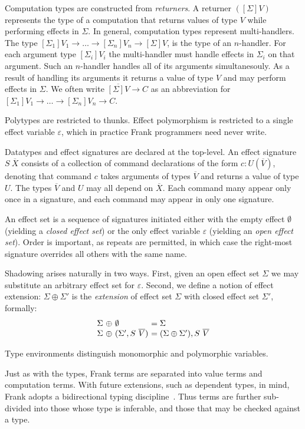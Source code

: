 \documentclass[preprint]{sigplanconf}
\newcommand{\many}{\overline}
\newcommand\ba{\begin{array}}
\newcommand\ea{\end{array}}
\newcommand{\sig}{S}
\newcommand{\sigs}{\Sigma}
\newcommand{\effbox}[1]{[#1]}
\begin{document}
Computation types are constructed from \emph{returners}.  A returner
$(\effbox{\sigs}V)$ represents the type of a computation that returns
values of type $V$ while performing effects in $\sigs$.
%
In general, computation types represent multi-handlers. The type
$\effbox{\sigs_1}V_1 \to \dots \to \effbox{\sigs_n}V_n \to
\effbox{\sigs}V$,
%
is the type of an $n$-handler. For each argument type
$\effbox{\sigs_i}V_i$ the multi-handler must handle effects in
$\sigs_i$ on that argument. Such an $n$-handler handles all of its
arguments simultanesouly. As a result of handling its arguments it
returns a value of type $V$ and may perform effects in $\sigs$.
%
We often write $\many{\effbox{\sigs}V} \to C$ as an abbreviation for
$\effbox{\sigs_1}V_1 \to \dots \to \effbox{\sigs_n}V_n \to C$.

Polytypes are restricted to thunks. Effect polymorphism is restricted
to a single effect variable $\varepsilon$, which in practice Frank
programmers need never write.

Datatypes and effect signatures are declared at the top-level. An
effect signature $S~\many{X}$ consists of a collection of command
declarations of the form $c:U(\many{V})$, denoting that command $c$
takes arguments of types $\many{V}$ and returns a value of type
$U$. The types $\many{V}$ and $U$ may all depend on $\many{X}$. Each
command many appear only once in a signature, and each command may
appear in only one signature.

An effect set is a sequence of signatures initiated either with the
empty effect $\emptyset$ (yielding a \emph{closed effect set}) or the
only effect variable $\varepsilon$ (yielding an \emph{open effect
  set}). Order is important, as repeats are permitted, in which case
the right-most signature overrides all others with the same name.

Shadowing arises naturally in two ways. First, given an open effect
set $\sigs$ we may substitute an arbitrary effect set for
$\varepsilon$. Second, we define a notion of effect extension: $\sigs
\oplus \sigs'$ is the \emph{extension} of effect set $\sigs$ with
closed effect set $\sigs'$, formally:
%
\[\ba{@{\sigs~\oplus~}l@{~}l@{}}
\emptyset               &= \sigs \\
(\sigs', \sig~\many{V}) &= (\sigs \oplus \sigs'), \sig~\many{V} \\
\ea\]

Type environments distinguish monomorphic and polymorphic variables.

Just as with the types, Frank terms are separated into value terms and
computation terms. With future extensions, such as dependent types, in
mind, Frank adopts a bidirectional typing
discipline~\cite{PierceT00}. Thus terms are further sub-divided into
those whose type is inferable, and those that may be checked against a
type.
\end{document}
